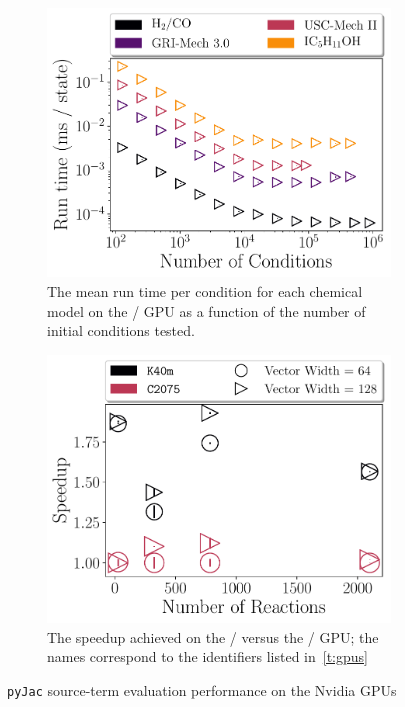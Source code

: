 \documentclass[12pt,number,sort&compress,preprint]{elsarticle}
\begin{document}
\begin{figure}[htbp]
   \centering
  \begin{subfigure}[t]{0.48\linewidth}
      \includegraphics[width=\textwidth]{gpu_source_scaling.pdf}
      \caption{The mean run time per condition for each chemical model on the \gpunew/ GPU as a function of the number of initial conditions tested.}
      \label{F:gpu_source_scaling}
  \end{subfigure}
  \hfill
  \begin{subfigure}[t]{0.48\linewidth}
      \includegraphics[width=\textwidth]{gpu_source_speedup.pdf}
      \caption{The speedup achieved on the \gpunew/ versus the \gpuold/ GPU; the names correspond to the identifiers listed in~\cref{t:gpus}}
      \label{F:gpu_source_speedup}
  \end{subfigure}
  \caption{\texttt{pyJac} source-term evaluation performance on the Nvidia GPUs}
  \label{F:gpu_source}
\end{figure}
\end{document}
